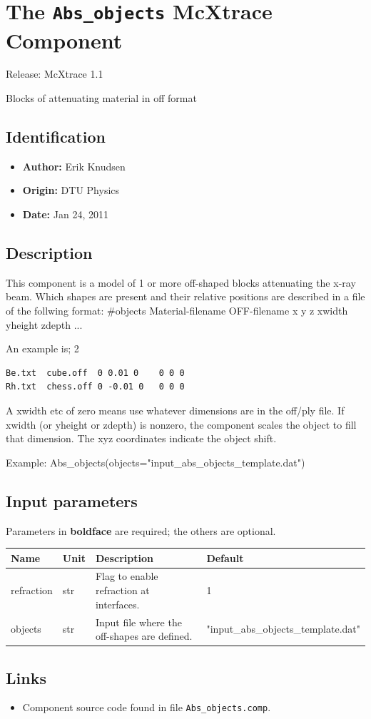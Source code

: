 \section{The \texttt{Abs\_objects} McXtrace Component}
Release: McXtrace 1.1

Blocks of attenuating material in off format

\subsection*{Identification}
\begin{itemize}
  \item \textbf{Author:} Erik Knudsen
  \item \textbf{Origin:} DTU Physics
  \item \textbf{Date:} Jan 24, 2011
\end{itemize}

\subsection*{Description}
This component is a model of 1 or more off-shaped blocks attenuating the x-ray beam. Which shapes are present and their relative positions are described in a file of the follwing format: \#objects Material-filename OFF-filename x y z xwidth yheight zdepth ...

An example is; 2

\begin{verbatim}
Be.txt  cube.off  0 0.01 0    0 0 0
Rh.txt  chess.off 0 -0.01 0   0 0 0
\end{verbatim}

A xwidth etc of zero means use whatever dimensions are in the off/ply file. If xwidth (or yheight or zdepth) is nonzero, the component scales the object to fill that dimension. The xyz coordinates indicate the object shift.

Example: Abs\_objects(objects="input\_abs\_objects\_template.dat")

\subsection*{Input parameters}
Parameters in \textbf{boldface} are required; the others are optional.

\begin{longtable}{p{}p{}p{}p{}}
\toprule
\textbf{Name} & \textbf{Unit} & \textbf{Description} & \textbf{Default} \\
\midrule
\endhead
refraction & str & Flag to enable refraction at interfaces. & 1 \\
objects & str & Input file where the off-shapes are defined. & "input\_abs\_objects\_template.dat" \\
\bottomrule
\end{longtable}

\subsection*{Links}
\begin{itemize}
  \item Component source code found in file \texttt{Abs\_objects.comp}.
\end{itemize}
